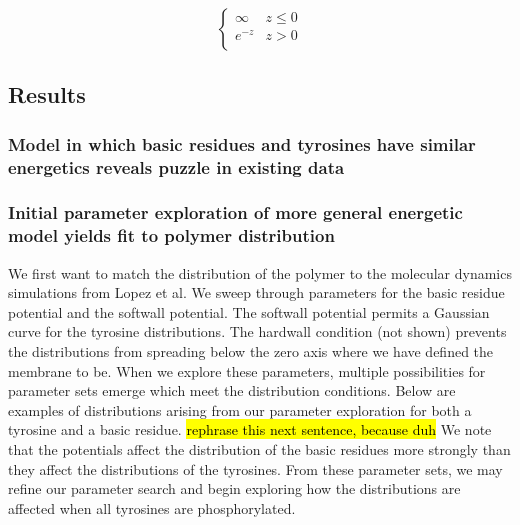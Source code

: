 \documentclass[../../AdvancementSummary.tex]{subfiles}
\begin{document}
\begin{equation}\label{eq: exponential}
\begin{cases}
\infty	& z \leq 0\\
e^{-z} & z > 0 \\
\end{cases}
\end{equation}


\subsection{Results}
\subsubsection{Model in which basic residues and tyrosines have similar energetics reveals puzzle in existing data}

\subsubsection{Initial parameter exploration of more general energetic model yields fit to polymer distribution}

We first want to match the distribution of the polymer to the molecular dynamics simulations from Lopez et al. We sweep through parameters for the basic residue potential and the softwall potential. The softwall potential permits a Gaussian curve for the tyrosine distributions.  The hardwall condition (not shown) prevents the distributions from spreading below the zero axis where we have defined the membrane to be. When we explore these parameters, multiple possibilities for parameter sets emerge which meet the distribution conditions. Below are examples of distributions arising from our parameter exploration for both a tyrosine and a basic residue. \hl{rephrase this next sentence, because duh} We note that the potentials affect the distribution of the basic residues more strongly than they affect the distributions of the tyrosines. From these parameter sets, we may refine our parameter search and begin exploring how the distributions are affected when all tyrosines are phosphorylated. 
\end{document}

